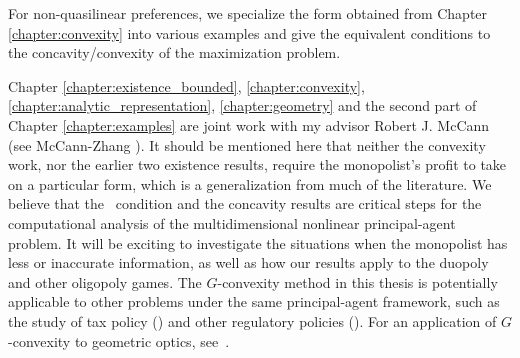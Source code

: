 For non-quasilinear preferences, we specialize the form obtained from Chapter \ref{chapter:convexity} into various examples  and give the equivalent conditions to the concavity/convexity of the maximization problem.\medskip


\begin{remark}
	Chapter \ref{chapter:existence_bounded}, \ref{chapter:convexity}, \ref{chapter:analytic_representation}, \ref{chapter:geometry} and the second part of Chapter \ref{chapter:examples} are joint work with my advisor Robert J. McCann (see McCann-Zhang \cite{McCannZhang17}). It should be mentioned here that neither the convexity work, nor the earlier two existence results, require the monopolist's profit to take on a particular form, which is a generalization from much of the literature. We believe that the \Gthree~condition and the concavity results are critical steps for the computational analysis of the  multidimensional nonlinear principal-agent problem. It will be exciting to investigate the situations when the monopolist has less or inaccurate information, as well as how our results apply to the duopoly and other oligopoly games. The $G$-convexity method in this thesis is potentially applicable to other problems under the same principal-agent framework, such as the study of tax policy (\cite{Mirrlees71}) and other regulatory policies (\cite{BaronMyerson82}). For an application of $G$-convexity to geometric optics, see~\cite{GuillenKitagawaCPAM}. \medskip
	
\end{remark}






